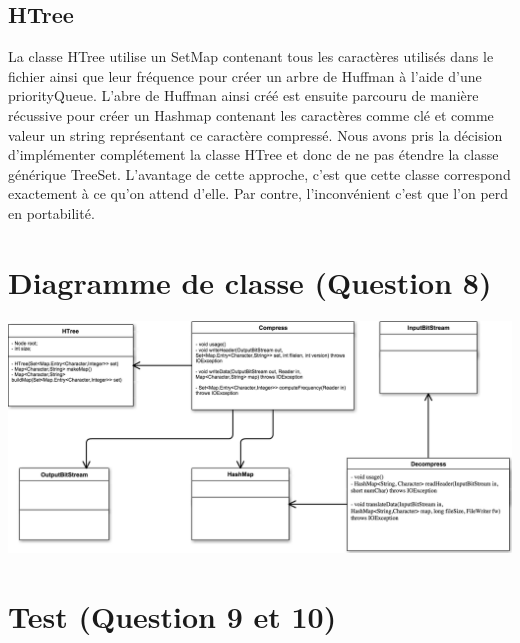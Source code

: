 \documentclass[10pt,a4paper]{article}
\begin{document}
\subsection*{HTree}
La classe HTree utilise un SetMap contenant tous les caractères utilisés dans le fichier ainsi que leur fréquence pour créer un arbre de Huffman à l'aide d'une priorityQueue. L'abre de Huffman ainsi créé est ensuite parcouru de manière récussive pour créer un Hashmap contenant les caractères comme clé et comme valeur un string représentant ce caractère compressé.
Nous avons pris la décision d'implémenter complétement la classe HTree et donc de ne pas étendre la classe générique TreeSet. L'avantage de cette approche, c'est que cette classe correspond exactement à ce qu'on attend d'elle. Par contre, l'inconvénient c'est que l'on perd en portabilité.


\section*{Diagramme de classe (Question 8)}
\begin{center}
    \includegraphics[scale=0.4]{UML.png}
\end{center}

\section*{Test (Question 9 et 10)}
\end{document}
